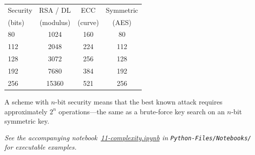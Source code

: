 \documentclass[a4paper, 12pt]{book} %
\newcommand{\notebook}[1]{\begingroup\small\itshape
    See the accompanying notebook~\href{run:./Python-Files/Notebooks/#1}{#1} in \texttt{Python-Files/Notebooks/} for executable examples.%
\endgroup}
\begin{document}
\begin{center}
\begin{tabular}{lccc}
    \toprule
    Security & RSA / DL & ECC & Symmetric \\
    (bits)   & (modulus) & (curve) & (AES) \\
    \midrule
    80    & 1024 & 160 & 80 \\
    112   & 2048 & 224 & 112 \\
    128   & 3072 & 256 & 128 \\
    192   & 7680 & 384 & 192 \\
    256   & 15360 & 521 & 256 \\
    \bottomrule
\end{tabular}
\end{center}

A scheme with $n$-bit security means that the best known attack requires
approximately $2^n$ operations---the same as a brute-force key search on an
$n$-bit symmetric key.













\notebook{11-complexity.ipynb}








\printbibliography
\printindex
\end{document}
